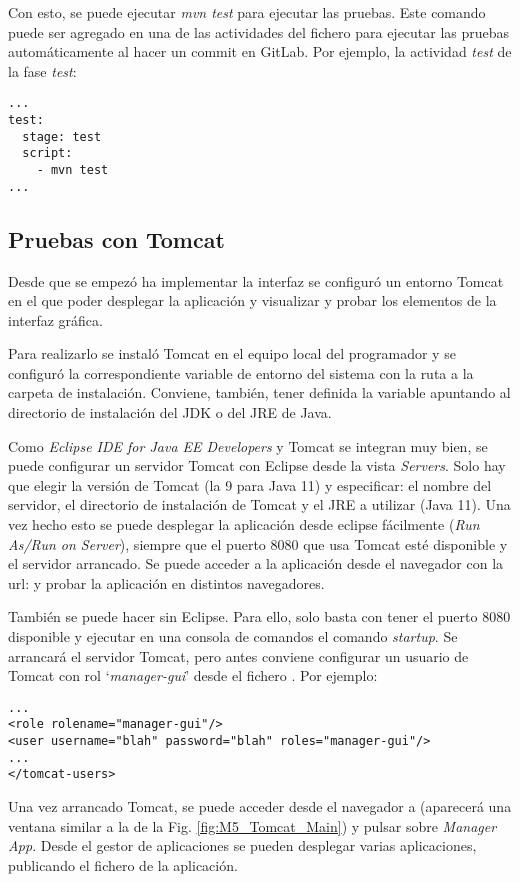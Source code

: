 Con esto, se puede ejecutar \textit{mvn test} para ejecutar las pruebas. Este comando puede ser agregado en una de las actividades del fichero  para ejecutar las pruebas automáticamente al hacer un commit en GitLab. Por ejemplo, la actividad \textit{test} de la fase \textit{test}:\\
\begin{minipage}{\linewidth}
{\tiny
\begin{lstlisting}[breaklines]
...
test:
  stage: test
  script:
	- mvn test
...
\end{lstlisting}
}
\end{minipage}

\subsection{Pruebas con Tomcat}

Desde que se empezó ha implementar la interfaz se configuró un entorno Tomcat en el que poder desplegar la aplicación y visualizar y probar los elementos de la interfaz gráfica.

Para realizarlo se instaló Tomcat en el equipo local del programador y se configuró la correspondiente variable de entorno del sistema  con la ruta a la carpeta de instalación. Conviene, también, tener definida la variable  apuntando al directorio de instalación del JDK o del JRE de Java.

Como \textit{Eclipse IDE for Java EE Developers} y Tomcat se integran muy bien, se puede configurar un servidor Tomcat con Eclipse desde la vista \textit{Servers}. Solo hay que elegir la versión de Tomcat (la 9 para Java 11) y especificar: el nombre del servidor, el directorio de instalación de Tomcat y el JRE a utilizar (Java 11). Una vez hecho esto se puede desplegar la aplicación desde eclipse fácilmente (\textit{Run As/Run on Server}), siempre que el puerto 8080 que usa Tomcat esté disponible y el servidor arrancado. Se puede acceder a la aplicación desde el navegador con la url:  y probar la aplicación en distintos navegadores.

También se puede hacer sin Eclipse. Para ello, solo basta con tener el puerto 8080 disponible y ejecutar en una consola de comandos el comando \textit{startup}. Se arrancará el servidor Tomcat, pero antes conviene configurar un usuario de Tomcat con rol `\textit{manager-gui}' desde el fichero . Por ejemplo:\\
\begin{minipage}{\linewidth}
{\tiny
\begin{lstlisting}[breaklines]
...
<role rolename="manager-gui"/>
<user username="blah" password="blah" roles="manager-gui"/>
...
</tomcat-users>
\end{lstlisting}
}
\end{minipage}
Una vez arrancado Tomcat, se puede acceder desde el navegador a  (aparecerá una ventana similar a la de la Fig. \ref{fig:M5_Tomcat_Main}) y pulsar sobre \textit{Manager App}. Desde el gestor de aplicaciones se pueden desplegar varias aplicaciones, publicando el fichero  de la aplicación.

